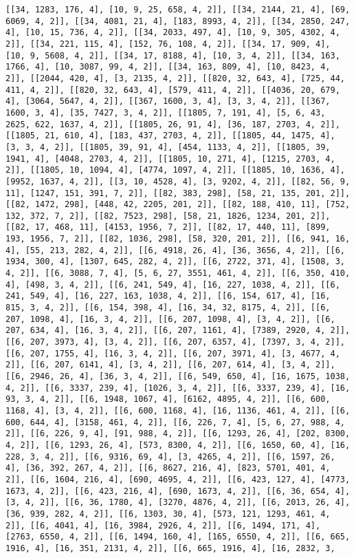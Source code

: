 \documentclass[12pt,fleqn]{article}\usepackage{../../common}
\begin{document}
\begin{verbatim}
[[34, 1283, 176, 4], [10, 9, 25, 658, 4, 2]], [[34, 2144, 21, 4], [69, 6069, 4, 2]], [[34, 4081, 21, 4], [183, 8993, 4, 2]], [[34, 2850, 247, 4], [10, 15, 736, 4, 2]], [[34, 2033, 497, 4], [10, 9, 305, 4302, 4, 2]], [[34, 221, 115, 4], [152, 76, 108, 4, 2]], [[34, 17, 909, 4], [10, 9, 5608, 4, 2]], [[34, 17, 8188, 4], [10, 3, 4, 2]], [[34, 163, 1766, 4], [10, 3087, 99, 4, 2]], [[34, 163, 809, 4], [10, 8423, 4, 2]], [[2044, 420, 4], [3, 2135, 4, 2]], [[820, 32, 643, 4], [725, 44, 411, 4, 2]], [[820, 32, 643, 4], [579, 411, 4, 2]], [[4036, 20, 679, 4], [3064, 5647, 4, 2]], [[367, 1600, 3, 4], [3, 3, 4, 2]], [[367, 1600, 3, 4], [35, 7427, 3, 4, 2]], [[1805, 7, 191, 4], [5, 6, 43, 2625, 622, 1637, 4, 2]], [[1805, 26, 91, 4], [36, 187, 2703, 4, 2]], [[1805, 21, 610, 4], [183, 437, 2703, 4, 2]], [[1805, 44, 1475, 4], [3, 3, 4, 2]], [[1805, 39, 91, 4], [454, 1133, 4, 2]], [[1805, 39, 1941, 4], [4048, 2703, 4, 2]], [[1805, 10, 271, 4], [1215, 2703, 4, 2]], [[1805, 10, 1094, 4], [4774, 1097, 4, 2]], [[1805, 10, 1636, 4], [9952, 1637, 4, 2]], [[3, 10, 4528, 4], [3, 9202, 4, 2]], [[82, 56, 9, 11], [1247, 151, 391, 7, 2]], [[82, 383, 298], [58, 21, 135, 201, 2]], [[82, 1472, 298], [448, 42, 2205, 201, 2]], [[82, 188, 410, 11], [752, 132, 372, 7, 2]], [[82, 7523, 298], [58, 21, 1826, 1234, 201, 2]], [[82, 17, 468, 11], [4153, 1956, 7, 2]], [[82, 17, 440, 11], [899, 193, 1956, 7, 2]], [[82, 1036, 298], [58, 320, 201, 2]], [[6, 941, 16, 4], [55, 213, 282, 4, 2]], [[6, 4918, 26, 4], [36, 3656, 4, 2]], [[6, 1934, 300, 4], [1307, 645, 282, 4, 2]], [[6, 2722, 371, 4], [1508, 3, 4, 2]], [[6, 3088, 7, 4], [5, 6, 27, 3551, 461, 4, 2]], [[6, 350, 410, 4], [498, 3, 4, 2]], [[6, 241, 549, 4], [16, 227, 1038, 4, 2]], [[6, 241, 549, 4], [16, 227, 163, 1038, 4, 2]], [[6, 154, 617, 4], [16, 815, 3, 4, 2]], [[6, 154, 398, 4], [16, 34, 32, 8175, 4, 2]], [[6, 207, 1098, 4], [16, 3, 4, 2]], [[6, 207, 1098, 4], [3, 4, 2]], [[6, 207, 634, 4], [16, 3, 4, 2]], [[6, 207, 1161, 4], [7389, 2920, 4, 2]], [[6, 207, 3973, 4], [3, 4, 2]], [[6, 207, 6357, 4], [7397, 3, 4, 2]], [[6, 207, 1755, 4], [16, 3, 4, 2]], [[6, 207, 3971, 4], [3, 4677, 4, 2]], [[6, 207, 6141, 4], [3, 4, 2]], [[6, 207, 614, 4], [3, 4, 2]], [[6, 2946, 26, 4], [36, 3, 4, 2]], [[6, 549, 650, 4], [16, 1675, 1038, 4, 2]], [[6, 3337, 239, 4], [1026, 3, 4, 2]], [[6, 3337, 239, 4], [16, 93, 3, 4, 2]], [[6, 1948, 1067, 4], [6162, 4895, 4, 2]], [[6, 600, 1168, 4], [3, 4, 2]], [[6, 600, 1168, 4], [16, 1136, 461, 4, 2]], [[6, 600, 644, 4], [3158, 461, 4, 2]], [[6, 226, 7, 4], [5, 6, 27, 988, 4, 2]], [[6, 226, 9, 4], [91, 988, 4, 2]], [[6, 1293, 26, 4], [202, 8300, 4, 2]], [[6, 1293, 26, 4], [573, 8300, 4, 2]], [[6, 1650, 60, 4], [16, 228, 3, 4, 2]], [[6, 9316, 69, 4], [3, 4265, 4, 2]], [[6, 1597, 26, 4], [36, 392, 267, 4, 2]], [[6, 8627, 216, 4], [823, 5701, 401, 4, 2]], [[6, 1604, 216, 4], [690, 4695, 4, 2]], [[6, 423, 127, 4], [4773, 1673, 4, 2]], [[6, 423, 216, 4], [690, 1673, 4, 2]], [[6, 36, 654, 4], [3, 4, 2]], [[6, 36, 1780, 4], [3270, 4876, 4, 2]], [[6, 2013, 26, 4], [36, 939, 282, 4, 2]], [[6, 1303, 30, 4], [573, 121, 1293, 461, 4, 2]], [[6, 4041, 4], [16, 3984, 2926, 4, 2]], [[6, 1494, 171, 4], [2763, 6550, 4, 2]], [[6, 1494, 160, 4], [165, 6550, 4, 2]], [[6, 665, 1916, 4], [16, 351, 2131, 4, 2]], [[6, 665, 1916, 4], [16, 2832, 3, 
\end{verbatim}
\end{document}
